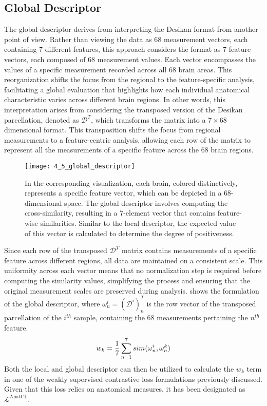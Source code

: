 \subsection{Global Descriptor}
The global descriptor derives from interpreting the Desikan format from another
point of view. Rather than viewing the data as 68 measurement vectors, each
containing 7 different features, this approach considers the format as 7 feature
vectors, each composed of 68 measurement values. Each vector encompasses the
values of a specific measurement recorded across all 68 brain areas. This
reorganization shifts the focus from the regional to the feature-specific
analysis, facilitating a global evaluation that highlights how each individual
anatomical characteristic varies across different brain regions. In other words,
this interpretation arises from considering the transposed version of the
Desikan parcellation, denoted as $\mathcal{D}^T$, which transforms the matrix
into a $7 \times 68$ dimensional format. This transposition shifts the focus from
regional measurements to a feature-centric analysis, allowing each row of the
matrix to represent all the measurements of a specific feature across the 68
brain regions.
\begin{figure}[t]
    \caption[Global Descriptor]{In the corresponding visualization, each brain,
    colored distinctively, represents a specific feature vector, which can be
    depicted in a 68-dimensional space. The global descriptor involves computing
    the cross-similarity, resulting in a 7-element vector that contains
    feature-wise similarities. Similar to the local descriptor, the expected
    value of this vector is calculated to determine the degree of positiveness.}
    \texttt{[image: 4\_5\_global\_descriptor]}
\end{figure}
Since each row of the transposed $\mathcal{D}^T$ matrix contains measurements of
a specific feature across different regions, all data are maintained on a
consistent scale. This uniformity across each vector means that no normalization
step is required before computing the similarity values, simplifying the process
and ensuring that the original measurement scales are preserved during analysis.
 shows the formulation of the global descriptor, where $\omega^i_n
= \left( \mathcal{D}^i \right)^T_n$ is the row vector of the transposed
parcellation of the $i^{th}$ sample, containing the 68 measurements pertaining
the $n^{th}$ feature.
\begin{equation}
    \labeq{4_9}
    w_k = \frac{1}{7}\sum_{n=1}^{7} sim(\omega^i_n, \omega^k_n)
\end{equation}
Both the local and global descriptor can then be utilized to calculate the $w_k$
term in one of the weakly supervised contrastive loss formulations previously
discussed. Given that this loss relies on anatomical measures, it has been
designated as $\mathcal{L}^{\text{AnatCL}}$.

